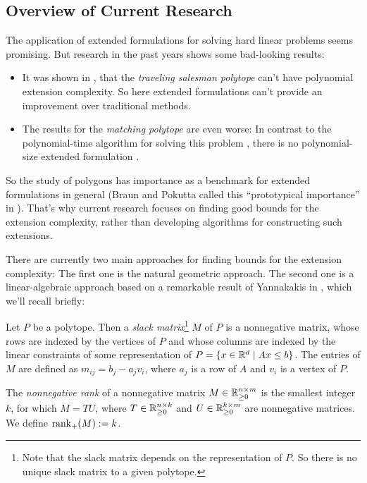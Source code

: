 \subsection{Overview of Current Research}

The application of extended formulations for solving hard linear problems seems promising. But research in the past years shows some bad-looking results:
\begin{itemize}
  \item It was shown in \cite{fiorini2015exponential}, that the \emph{traveling salesman polytope} can't have polynomial extension complexity. So here extended formulations can't provide an improvement over traditional methods.
  \item The results for the \emph{matching polytope} are even worse: In contrast to the polynomial-time algorithm for solving this problem \cite{ford1956maximal}, there is no polynomial-size extended formulation \cite{rothvoss2017matching}.
\end{itemize}

So the study of polygons has importance as a benchmark for extended formulations in general (Braun and Pokutta called this ``prototypical importance'' in \cite{braun2015matching}).
That's why current research focuses on finding good bounds for the extension complexity, rather than developing algorithms for constructing such extensions.

There are currently two main approaches for finding bounds for the extension complexity: The first one is the natural geometric approach. The second one is a linear-algebraic approach based on a remarkable result of Yannakakis in \cite{yannakakis1991expressing}, which we'll recall briefly:

\begin{definition}
  Let $P$ be a polytope.
  Then a \emph{slack matrix}\footnote{Note that the slack matrix depends on the representation of $P$. So there is no unique slack matrix to a given polytope.} $M$ of $P$ is a nonnegative matrix, whose rows are indexed by the vertices of $P$ and whose columns are indexed by the linear constraints of some representation of $P=\{x \in \mathbb{R}^d \mid Ax \leq b\}$. 
  The entries of $M$ are defined as $m_{ij} = b_j - a_j v_i$, where $a_j$ is a row of $A$ and $v_i$ is a vertex of $P$.
\end{definition}

\begin{definition}
  The \emph{nonnegative rank} of a nonnegative matrix $M \in \mathbb{R}_{\geq 0}^{n \times m}$ is the smallest integer $k$, for which $M = TU$, where $T \in \mathbb{R}_{\geq 0}^{n \times k}$ and $U \in \mathbb{R}_{\geq 0}^{k \times m}$ are nonnegative matrices.
  We define $\operatorname{rank}_+(M) := k$.
\end{definition}

